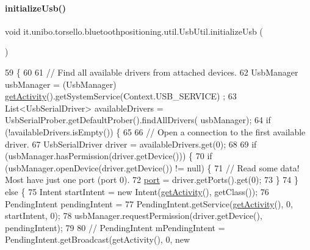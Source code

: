 \paragraph{\texorpdfstring{initialize\+Usb()}{initializeUsb()}}
{\footnotesize\ttfamily void it.\+unibo.\+torsello.\+bluetoothpositioning.\+util.\+Usb\+Util.\+initialize\+Usb (\begin{DoxyParamCaption}{ }\end{DoxyParamCaption})\hspace{0.3cm}{\ttfamily [private]}}


\begin{DoxyCode}
59                                  \{
60 
61         \textcolor{comment}{// Find all available drivers from attached devices.}
62         UsbManager usbManager = (UsbManager) \hyperlink{classit_1_1unibo_1_1torsello_1_1bluetoothpositioning_1_1util_1_1UsbUtil_a625b1885830a4d2c359a534834a46648_a625b1885830a4d2c359a534834a46648}{getActivity}().getSystemService(Context.USB\_SERVICE)
      ;
63         List<UsbSerialDriver> availableDrivers = UsbSerialProber.getDefaultProber().findAllDrivers(
      usbManager);
64         \textcolor{keywordflow}{if} (!availableDrivers.isEmpty()) \{
65 
66             \textcolor{comment}{// Open a connection to the first available driver.}
67             UsbSerialDriver driver = availableDrivers.get(0);
68 
69             \textcolor{keywordflow}{if} (usbManager.hasPermission(driver.getDevice())) \{
70                 \textcolor{keywordflow}{if} (usbManager.openDevice(driver.getDevice()) != null) \{
71                     \textcolor{comment}{// Read some data! Most have just one port (port 0).}
72                     \hyperlink{classit_1_1unibo_1_1torsello_1_1bluetoothpositioning_1_1util_1_1UsbUtil_a49aef08510b6d48d627670d834099c36_a49aef08510b6d48d627670d834099c36}{port} = driver.getPorts().get(0);
73                 \}
74             \} \textcolor{keywordflow}{else} \{
75                 Intent startIntent = \textcolor{keyword}{new} Intent(\hyperlink{classit_1_1unibo_1_1torsello_1_1bluetoothpositioning_1_1util_1_1UsbUtil_a625b1885830a4d2c359a534834a46648_a625b1885830a4d2c359a534834a46648}{getActivity}(), getClass());
76                 PendingIntent pendingIntent =
77                         PendingIntent.getService(\hyperlink{classit_1_1unibo_1_1torsello_1_1bluetoothpositioning_1_1util_1_1UsbUtil_a625b1885830a4d2c359a534834a46648_a625b1885830a4d2c359a534834a46648}{getActivity}(), 0, startIntent, 0);
78                 usbManager.requestPermission(driver.getDevice(), pendingIntent);
79 
80 \textcolor{comment}{//                PendingIntent mPendingIntent = PendingIntent.getBroadcast(getActivity(), 0, new
}
\end{DoxyCode}
